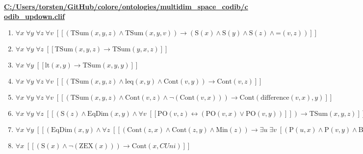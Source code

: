 \documentclass{article}
\begin{document}
\textbf{\url{C:/Users/torsten/GitHub/colore/ontologies/multidim\_space\_codib/codib\_updown.clif}}

\begin{enumerate}
\item $\forall x\; \forall y\; \forall z\; \forall v\;  \left[ \left[ \left(\textrm{TSum}(x,y,z) \land \textrm{TSum}(x,y,v)\right) \rightarrow \left(\textrm{S}(x) \land \textrm{S}(y) \land \textrm{S}(z) \land \textrm{=}(v,z)\right) \right] \right]$
\item $\forall x\; \forall y\; \forall z\;  \left[ \left[ \textrm{TSum}(x,y,z) \rightarrow \textrm{TSum}(y,x,z) \right] \right]$
\item $\forall x\; \forall y\;  \left[ \left[ \textrm{lt}(x,y) \rightarrow \textrm{TSum}(x,y,y) \right] \right]$
\item $\forall x\; \forall y\; \forall z\; \forall v\;  \left[ \left[ \left(\textrm{TSum}(x,y,z) \land \textrm{leq}(x,y) \land \textrm{Cont}(v,y)\right) \rightarrow \textrm{Cont}(v,z) \right] \right]$
\item $\forall x\; \forall y\; \forall z\; \forall v\;  \left[ \left[ \left(\textrm{TSum}(x,y,z) \land \textrm{Cont}(v,z) \land \neg \left(\textrm{Cont}(v,x)\right)\right) \rightarrow \textrm{Cont}(\textrm{difference}(v,x),y) \right] \right]$
\item $\forall x\; \forall y\; \forall z\;  \left[ \left[ \left(\textrm{S}(z) \land \textrm{EqDim}(x,y) \land \forall v\;  \left[ \left[ \textrm{PO}(v,z) \leftrightarrow \left(\textrm{PO}(v,x) \lor \textrm{PO}(v,y)\right) \right] \right]\right) \rightarrow \textrm{TSum}(x,y,z) \right] \right]$
\item $\forall x\; \forall y\;  \left[ \left[ \left(\textrm{EqDim}(x,y) \land \forall z\;  \left[ \left[ \left(\textrm{Cont}(z,x) \land \textrm{Cont}(z,y) \land \textrm{Min}(z)\right) \rightarrow \exists u\; \exists v\;  \left[ \left(\textrm{P}(u,x) \land \textrm{P}(v,y) \land \textrm{BCont}(z,u) \land \textrm{BCont}(z,v)\right) \right] \right] \right]\right) \rightarrow \exists z\;  \left[ \textrm{TSum}(x,y,z) \right] \right] \right]$
\item $\forall x\;  \left[ \left[ \left(\textrm{S}(x) \land \neg \left(\textrm{ZEX}(x)\right)\right) \rightarrow \textrm{Cont}(x,CUni) \right] \right]$
\end{enumerate}
\end{document}
